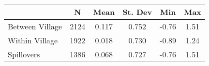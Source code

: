\begin{tabular}{l*{5}{c}}\hline&\multicolumn{1}{c}{N}&\multicolumn{1}{c}{Mean}&\multicolumn{1}{c}{St. Dev}&\multicolumn{1}{c}{Min}&\multicolumn{1}{c}{Max}\\ \hline 
Between Village & 2124 & 0.117 & 0.752 & -0.76 & 1.51 \\
Within Village & 1922 & 0.018 & 0.730 & -0.89 & 1.24 \\
Spillovers & 1386 & 0.068 & 0.727 & -0.76 & 1.51 \\
\hline \end{tabular}
